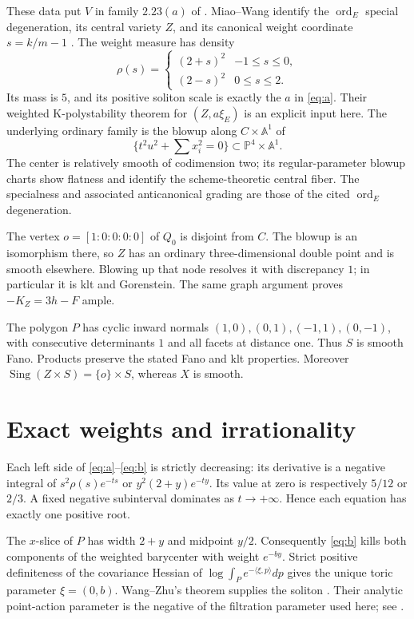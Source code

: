 \documentclass[11pt,a4paper]{article}
\newcommand{\ord}{\operatorname{ord}}
\begin{document}
These data put \(V\) in family \(2.23(a)\) of \cite{MW}.
Miao--Wang identify the \(\ord_E\) special degeneration, its central
variety \(Z\), and its canonical weight coordinate \(s=k/m-1\)
\cite[\S3.1, Theorems~3.1--3.2]{MW}. The weight measure has density
\[
 \rho(s)=
 \begin{cases}(2+s)^2&-1\leq s\leq0,\\
               (2-s)^2&0\leq s\leq2.
 \end{cases}
\]
Its mass is \(5\), and its positive soliton scale is exactly the \(a\)
in \eqref{eq:a}. Their weighted K-polystability theorem for
\((Z,a\xi_E)\) is an explicit input here.
The underlying ordinary family is the blowup along \(C\times\mathbb A^1\)
of
\[
 \{t^2u^2+\textstyle\sum x_i^2=0\}\subset\mathbb P^4\times\mathbb A^1 .
\]
The center is relatively smooth of codimension two; its regular-parameter
blowup charts show flatness and identify the scheme-theoretic central
fiber. The specialness and associated anticanonical grading are those
of the cited \(\ord_E\) degeneration.

The vertex \(o=[1:0:0:0:0]\) of \(Q_0\) is disjoint from \(C\).
The blowup is an isomorphism there, so \(Z\) has an ordinary
three-dimensional double point and is smooth elsewhere. Blowing up that
node resolves it with discrepancy \(1\); in particular it is klt and
Gorenstein. The same graph argument proves \(-K_Z=3h-F\) ample.

The polygon \(P\) has cyclic inward normals
\((1,0),(0,1),(-1,1),(0,-1)\), with consecutive determinants \(1\)
and all facets at distance one. Thus \(S\) is smooth Fano.
Products preserve the stated Fano and klt properties. Moreover
\(\operatorname{Sing}(Z\times S)=\{o\}\times S\), whereas \(X\) is smooth.

\section{Exact weights and irrationality}

Each left side of \eqref{eq:a}--\eqref{eq:b} is strictly decreasing:
its derivative is a negative integral of \(s^2\rho(s)e^{-ts}\)
or \(y^2(2+y)e^{-ty}\). Its value at zero is respectively
\(5/12\) or \(2/3\). A fixed negative subinterval dominates as
\(t\to+\infty\). Hence each equation has exactly one positive root.

The \(x\)-slice of \(P\) has width \(2+y\) and midpoint \(y/2\).
Consequently \eqref{eq:b} kills both components of the weighted
barycenter with weight \(e^{-by}\).
Strict positive definiteness of the covariance Hessian of
\(\log\int_Pe^{-\langle\xi,p\rangle}dp\) gives the unique toric
parameter \(\xi=(0,b)\). Wang--Zhu's theorem supplies the soliton
\cite{WZ}. Their analytic point-action parameter is the negative of
the filtration parameter used here; see \cite[Remark~2.45]{HL}.
\end{document}
